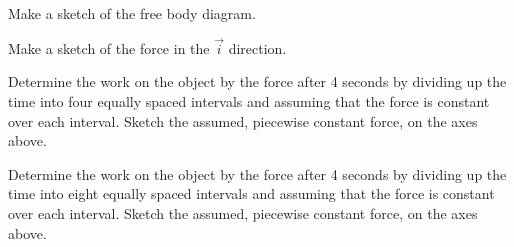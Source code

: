 \begin{problem}
  \begin{subproblem}
    \item Make a sketch of the free body diagram.
      \vspace{4em}
    \item Make a sketch of the force in the $\vec{i}$ direction. \\
      \scalebox{0.5}{}
    \item Determine the work on the object by the force after 4
      seconds by dividing up the time into four equally spaced
      intervals and assuming that the force is constant over each
      interval. Sketch the assumed, piecewise constant force, on the
      axes above.  
      \vfill
    \item Determine the work on the object by the force after 4
      seconds by dividing up the time into eight equally spaced
      intervals and assuming that the force is constant over each
      interval. Sketch the assumed, piecewise constant force, on the
      axes above.  
      \vfill
  \end{subproblem}

\end{problem}




